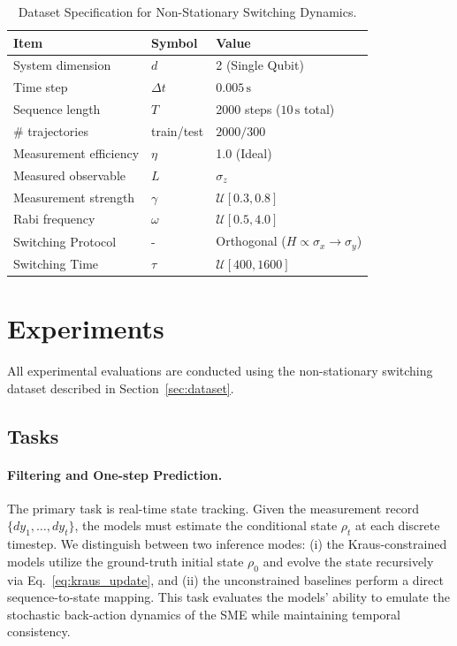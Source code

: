 \documentclass{article} %
\begin{document}
\begin{table}[t]
\centering
\caption{Dataset Specification for Non-Stationary Switching Dynamics.}
\label{tab:data_specs}
\begin{tabular}{@{}lll@{}}
\toprule
\textbf{Item} & \textbf{Symbol} & \textbf{Value} \\ \midrule
System dimension & $d$ & 2 (Single Qubit) \\
Time step & $\Delta t$ & $0.005\,\mathrm{s}$ \\
Sequence length & $T$ & 2000 steps ($10\,\mathrm{s}$ total) \\
\# trajectories & train/test & $2000 / 300$ \\
Measurement efficiency & $\eta$ & 1.0 (Ideal) \\
Measured observable & $L$ & $\sigma_z$ \\
Measurement strength & $\gamma$ & $\mathcal{U}[0.3, 0.8]$ \\
Rabi frequency & $\omega$ & $\mathcal{U}[0.5, 4.0]$ \\
Switching Protocol & - & Orthogonal ($H \propto \sigma_x \to \sigma_y$) \\
Switching Time & $\tau$ & $\mathcal{U}[400, 1600]$ \\
\bottomrule
\end{tabular}
\end{table}

\section{Experiments}
\label{sec:experiments}
All experimental evaluations are conducted using the non-stationary switching dataset described in Section~\ref{sec:dataset}.

\subsection{Tasks}

\paragraph{Filtering and One-step Prediction.}
The primary task is real-time state tracking. Given the measurement record $\{dy_1, \ldots, dy_t\}$, the models must estimate the conditional state $\rho_t$ at each discrete timestep. We distinguish between two inference modes: (i) the Kraus-constrained models utilize the ground-truth initial state $\rho_0$ and evolve the state recursively via Eq.~\eqref{eq:kraus_update}, and (ii) the unconstrained baselines perform a direct sequence-to-state mapping. This task evaluates the models' ability to emulate the stochastic back-action dynamics of the SME while maintaining temporal consistency.
\end{document}
